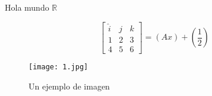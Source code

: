 Hola mundo
\lipsum[2]
$\mathbb{R}$

\begin{equation}
    \begin{bmatrix}
        \hat{i}&j&k\\
        1&2&3\\
        4&5&6
        \end{bmatrix} = (Ax)+\left(\frac{1}{2}\right)
\end{equation}

\begin{figure}[ht]
    \centering
    \texttt{[image: 1.jpg]}
    \caption{Un ejemplo de imagen}
    \label{fig:example}
\end{figure}